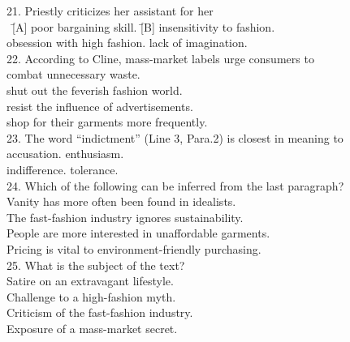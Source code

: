 \begin{tabbing}
21. Priestly criticizes her assistant for her\\
\hspace{0cm}\ \=[A] poor bargaining skill. \quad\quad\quad\quad\= [B] insensitivity to fashion.\\
\> [C] obsession with high fashion. \> [D] lack of imagination.\\

22. According to Cline, mass-market labels urge consumers to\\
\> [A] combat unnecessary waste.\\
\> [B] shut out the feverish fashion world.\\
\> [C] resist the influence of advertisements.\\
\> [D] shop for their garments more frequently.\\

23. The word “indictment” (Line 3, Para.2) is closest in meaning to\\
\> [A] accusation.
\> [B] enthusiasm.\\
\> [C] indifference.
\> [D] tolerance.\\

24. Which of the following can be inferred from the last paragraph?\\
\> [A] Vanity has more often been found in idealists.\\
\> [B] The fast-fashion industry ignores sustainability.\\
\> [C] People are more interested in unaffordable garments.\\
\> [D] Pricing is vital to environment-friendly purchasing.\\

25. What is the subject of the text?\\
\> [A] Satire on an extravagant lifestyle.\\
\> [B] Challenge to a high-fashion myth.\\
\> [C] Criticism of the fast-fashion industry.\\
\> [D] Exposure of a mass-market secret.\\
\end{tabbing}